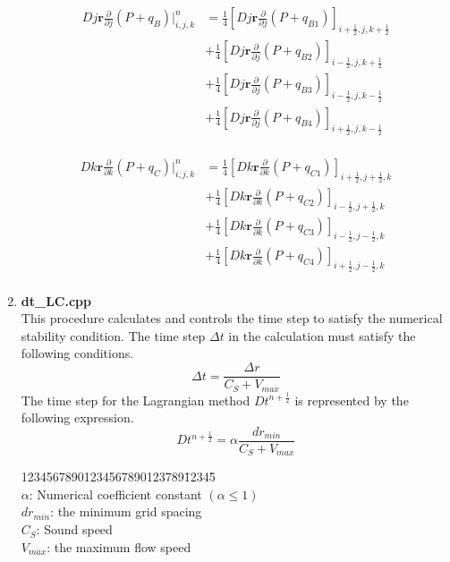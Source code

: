 \begin{enumerate}
\begin{equation}
\begin{split}
Dj\bm r\frac{\partial}{\partial j}(P+q_B)\bigg|^n_{i,j,k}&=
\frac{1}{4}\left[Dj\bm r\frac{\partial}{\partial j}(P+q_{B1})\right]_{i+\frac{1}{2},j,k+\frac{1}{2}}\\&
+\frac{1}{4}\left[Dj\bm r\frac{\partial}{\partial j}(P+q_{B2})\right]_{i-\frac{1}{2},j,k+\frac{1}{2}}\\&
+\frac{1}{4}\left[Dj\bm r\frac{\partial}{\partial j}(P+q_{B3})\right]_{i-\frac{1}{2},j,k-\frac{1}{2}}\\&
+\frac{1}{4}\left[Dj\bm r\frac{\partial}{\partial j}(P+q_{B4})\right]_{i+\frac{1}{2},j,k-\frac{1}{2}}\\
\end{split}
\end{equation}

\begin{equation}
\begin{split}
Dk\bm r\frac{\partial}{\partial k}(P+q_C)\bigg|^n_{i,j,k}&=
\frac{1}{4}\left[Dk\bm r\frac{\partial}{\partial k}(P+q_{C1})\right]_{i+\frac{1}{2},j+\frac{1}{2},k}\\&
+\frac{1}{4}\left[Dk\bm r\frac{\partial}{\partial k}(P+q_{C2})\right]_{i-\frac{1}{2},j+\frac{1}{2},k}\\&
+\frac{1}{4}\left[Dk\bm r\frac{\partial}{\partial k}(P+q_{C3})\right]_{i-\frac{1}{2},j-\frac{1}{2},k}\\&
+\frac{1}{4}\left[Dk\bm r\frac{\partial}{\partial k}(P+q_{C4})\right]_{i+\frac{1}{2},j-\frac{1}{2},k}\\
\end{split}
\end{equation}
	
\item {\bf dt\_LC.cpp}\\
This procedure calculates and controls the time step to satisfy the numerical stability condition. The time step $ \Delta t $ in the calculation must satisfy the following conditions.
	\begin{equation}
	\label{eq:Courant}
		\Delta t=\frac{\Delta r}{C_{S}+V_{max}}
	\end{equation}
The time step for the Lagrangian method $ Dt ^ {n + \frac {1}{2}} $ is represented by the following expression.
	\begin{equation}
		Dt^{n+\frac{1}{2}}=\alpha\displaystyle\frac{dr_{min}}{C_S+V_{max}}
	\end{equation}
		\begin{tabbing}
		12345678901234567890123\=789\=12345\=\kill\\
		\>\>$\alpha$\>: Numerical coefficient constant $(\alpha\leq1)$\\
		\>\>$dr_{min}$\>: the minimum grid spacing\\
		\>\>$C_S$\>: Sound speed\\
		\>\>$V_{max}$\>: the maximum flow speed\\
	\end{tabbing}
	

\end{enumerate}
